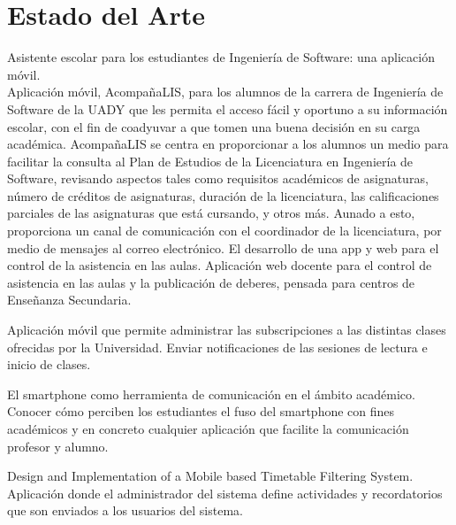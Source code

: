 \documentclass[10pt]{article}
\begin{document}
\section{Estado del Arte}
\justify
\cite{IEEEreferencias:Ref1} Asistente escolar para los estudiantes de Ingeniería de Software: una aplicación móvil.\\
Aplicación móvil, AcompañaLIS, para los
alumnos de la carrera de Ingeniería de Software de la UADY que les permita el
acceso fácil y oportuno a su información escolar, con el fin de coadyuvar a que
tomen una buena decisión en su carga académica. AcompañaLIS se centra en
proporcionar a los alumnos un medio para facilitar la consulta al Plan de Estudios
de la Licenciatura en Ingeniería de Software, revisando aspectos tales como
requisitos académicos de asignaturas, número de créditos de asignaturas,
duración de la licenciatura, las calificaciones parciales de las asignaturas que
está cursando, y otros más. Aunado a esto, proporciona un canal de
comunicación con el coordinador de la licenciatura, por medio de mensajes al
correo electrónico. 
El  desarrollo de una app y web para el control de la asistencia en las aulas. 
Aplicación web docente para el control de asistencia en las aulas y la publicación de deberes, pensada para centros de Enseñanza Secundaria.
\par\vspace{\baselineskip}
\justify
\cite{IEEEreferencias:Ref2} Aplicación móvil que permite administrar las subscripciones a las distintas clases ofrecidas por la Universidad. Enviar notificaciones de las sesiones de lectura e inicio de clases.


\par\vspace{\baselineskip}
\justify
El \cite{IEEEreferencias:Ref3} smartphone como herramienta de comunicación en el ámbito académico.\\
Conocer cómo perciben los estudiantes el fuso del smartphone con fines académicos y en concreto cualquier aplicación que facilite la comunicación profesor y alumno. 
\par\vspace{\baselineskip}


\par\vspace{\baselineskip}
\justify
\cite{IEEEreferencias:Ref4} Design and Implementation of a Mobile based Timetable Filtering System.\\
Aplicación donde el administrador del sistema define actividades y recordatorios que son enviados a los usuarios del sistema.
\par\vspace{\baselineskip}
\end{document}

